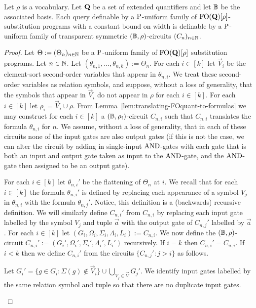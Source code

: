 \documentclass[../main/thesis.tex]{subfiles}
\begin{document}
\begin{prop}
  Let $\rho$ is a vocabulary. Let $\mathbf{Q}$ be a set of extended quantifiers
  and let $\mathbb{B}$ be the associated basis. Each query definable by a $\mathrm{P}$-uniform
  family of $\text{\upshape FO}(\mathbf{Q})[\rho]$-substitution programs with a constant bound
  on width is definable by a $\mathrm{P}$-uniform family of transparent symmetric
  $(\mathbb{B}, \rho)$-circuits $(C_n)_{n \in \mathbb{N}}$.
  \label{prop:translating-programs-to-circuits}
\end{prop}
\begin{proof}
  Let $\Theta := (\Theta_n)_{n \in \mathbb{N}}$ be a $\mathrm{P}$-uniform family of
  $\text{\upshape FO}(\mathbf{Q})[\rho]$ substitution programs. Let $n \in \mathbb{N}$. Let
  $(\theta_{n, 1}, \ldots, \theta_{n, k}) := \Theta_n$. For each $i \in [k]$ let
  $\vec{V}_i$ be the element-sort second-order variables that appear in
  $\theta_{n, i}$. We treat these second-order variables as relation symbols,
  and suppose, without a loss of generality, that the symbols that appear in
  $\vec{V}_i$ do not appear in $\rho$ for each $i \in [k]$. For each $i \in [k]$
  let $\rho_i = \vec{V}_i \cup \rho$. From
  Lemma~\ref{lem:translating-FOquant-to-formulas} we may construct for each $i
  \in [k]$ a $(\mathbb{B}, \rho_i)$-circuit $C_{n, i}$ such that $C_{n, i}$ translates
  the formula $\theta_{n, i}$ for $n$. We assume, without a loss of generality,
  that in each of these circuits none of the input gates are also output gates
  (if this is not the case, we can alter the circuit by adding in single-input
  $\text{\upshape AND}$-gates with each gate that is both an input and output gate taken as
  input to the $\text{\upshape AND}$-gate, and the $\text{\upshape AND}$-gate then assigned to be an output
  gate).

  For each $i \in [k]$ let $\theta_{n, i}'$ be the flattening of $\Theta_n$ at
  $i$. We recall that for each $i \in [k]$ the formula $\theta_{n, i}'$ is
  defined by replacing each appearance of a symbol $V_j$ in $\theta_{n, i}$ with
  the formula $\theta_{n, j}'$. Notice, this definition is a (backwards)
  recursive definition. We will similarly define $C_{n, i}'$ from $C_{n, i}$ by
  replacing each input gate labelled by the symbol $V_j$ and tuple $\vec{a}$
  with the output gate of $C_{n, j}'$ labelled by $\vec{a}$. For each $i \in
  [k]$ let $(G_i, \Omega_i, \Sigma_i, \Lambda_i, L_i) := C_{n, i}$. We now
  define the $(\mathbb{B},\rho)$-circuit $C_{n, i}' := (G_i', \Omega_i', \Sigma_i',
  \Lambda_i', L_i')$ recursively. If $i = k$ then $C_{n, i}' = C_{n, i}$. If $i
  < k$ then we define $C_{n, i}' $ from the circuits $\{C_{n, j}' : j > i \}$ as
  follows.
  \begin{myitemize}
  \item Let $G_i' = \{g \in G_i : \Sigma (g) \not\in \vec{V}_i\} \cup
    \bigcup_{V_{j} \in \vec{V}} G_{j}'$. We identify input gates labelled by the
    same relation symbol and tuple so that there are no duplicate input gates.
    

\end{myitemize}
\end{proof}
\end{document}
